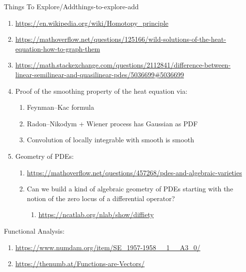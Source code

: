 \begin{remark}{Things To Explore/Add}{things-to-explore-add}
\begin{enumerate}
\begin{enumerate}
                \item \url{https://arxiv.org/abs/2312.05226}, \url{https://arxiv.org/abs/2406.16825}
                \item \url{https://arxiv.org/abs/2304.08671}, \url{https://arxiv.org/abs/2404.07931}
                \item \url{https://arxiv.org/abs/2507.07937}
            \end{enumerate}
        \item \url{https://en.wikipedia.org/wiki/Homotopy_principle}
        \item \url{https://mathoverflow.net/questions/125166/wild-solutions-of-the-heat-equation-how-to-graph-them}
        \item \url{https://math.stackexchange.com/questions/2112841/difference-between-linear-semilinear-and-quasilinear-pdes/5036699\#5036699}
        \item Proof of the smoothing property of the heat equation via:
            \begin{enumerate}
                \item Feynman--Kac formula
                \item Radon--Nikodym + Wiener process has Gaussian as PDF
                \item Convolution of locally integrable with smooth is smooth
            \end{enumerate}
        \item Geometry of PDEs:
            \begin{enumerate}
                \item \url{https://mathoverflow.net/questions/457268/pdes-and-algebraic-varieties}
                \item Can we build a kind of algebraic geometry of PDEs starting with the notion of the zero locus of a differential operator?
                    \begin{enumerate}
                        \item \url{https://ncatlab.org/nlab/show/diffiety}
                    \end{enumerate}
            \end{enumerate}
    \end{enumerate}
    Functional Analysis:
    \begin{enumerate}
        \item \url{https://www.numdam.org/item/SE_1957-1958__1__A3_0/}
        \item \url{https://thenumb.at/Functions-are-Vectors/}

\end{enumerate}
\end{remark}
